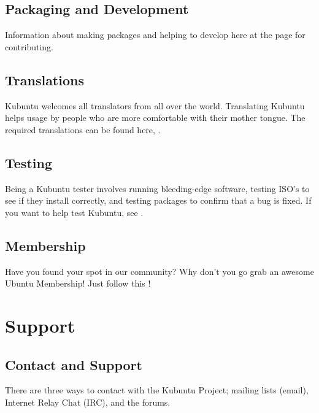 \documentclass[letterpaper,10pt,english]{sphinxmanual}
\begin{document}
\section{Packaging and Development}
\label{\detokenize{docs/contribute:packaging-and-development}}
Information about making packages and helping to develop here at the {\hyperref[\detokenize{docs/packaging_guide/welcome:contribute-dev-link}]{}} page for contributing.


\section{Translations}
\label{\detokenize{docs/contribute:translations}}
Kubuntu welcomes all translators from all over the world. Translating Kubuntu helps usage by people who are more comfortable with their mother tongue. The required translations can be found here, .


\section{Testing}
\label{\detokenize{docs/contribute:testing}}
Being a Kubuntu tester involves running bleeding-edge software, testing ISO’s to see if they install correctly, and testing packages to confirm that a bug is fixed. If you want to help test Kubuntu, see .


\section{Membership}
\label{\detokenize{docs/contribute:membership}}
Have you found your spot in our community? Why don’t you go grab an awesome Ubuntu Membership! Just follow this !


\chapter{Support}
\label{\detokenize{docs/support:support}}\label{\detokenize{docs/support:support-link}}\label{\detokenize{docs/support::doc}}

\section{Contact and Support}
\label{\detokenize{docs/support:contact-and-support}}
There are three ways to contact with the Kubuntu Project; mailing lists (email), Internet Relay Chat (IRC), and the forums.
\end{document}
